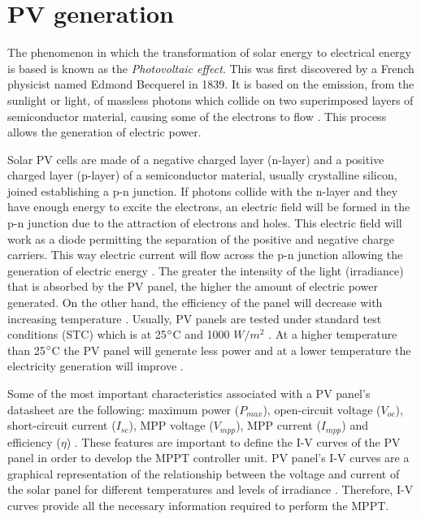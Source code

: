 \section{PV generation}

The phenomenon in which the transformation of solar energy to electrical energy is based is known as the \textit{Photovoltaic effect}. This  was first discovered by a French physicist named Edmond Becquerel in 1839. It is based on the emission, from the sunlight or light, of massless photons which collide on two superimposed layers of semiconductor material, causing some of the electrons to flow \cite{PVeffect}. This process allows the generation of electric power. 

Solar PV cells are made of a negative charged layer (n-layer) and a positive charged layer (p-layer) of a semiconductor material, usually crystalline silicon, joined establishing a p-n junction. If photons collide with the n-layer and they have enough energy to excite the electrons, an electric field will be formed in the p-n junction due to the attraction of electrons and holes. This electric field will work as a diode permitting the separation of the positive and negative charge carriers. This way electric current will flow across the p-n junction allowing the generation of electric energy \cite{PVsolarenergy}. %
The greater the intensity of the light (irradiance) that is absorbed by the PV panel, the higher the amount of electric power generated. On the other hand, the efficiency of the panel will decrease with increasing temperature \cite{handbook}. Usually, PV panels are tested under standard test conditions (STC) which is at 25$\dec$C and 1000 $W/ m^2$ \cite{handbook}. At a higher temperature than 25$\dec$C the PV panel will generate less power and at a lower temperature the electricity generation will improve \cite{handbook}.  %

Some of the most important characteristics associated with a PV panel’s datasheet are the following: maximum power ($P_{max}$), open-circuit voltage ($V_{oc}$), short-circuit current ($I_{sc}$), MPP voltage ($V_{mpp}$), MPP current ($I_{mpp}$) and efficiency ($\eta$) \cite{handbook}.  %
These features are important to define the I-V curves of the PV panel in order to develop the MPPT controller unit. PV panel's I-V curves are a graphical representation of the relationship between the voltage and current of the solar panel for different temperatures and levels of irradiance \cite{IVcurves}. Therefore, I-V curves provide all the necessary information required to perform the MPPT. %

